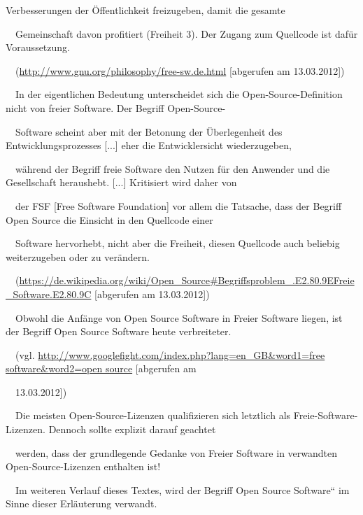 \documentclass[a4paper]{article}
\begin{document}
\begin{itemize}
{{Verbesserungen der \"Offentlichkeit freizugeben, damit die gesamte\par
\ \ Gemeinschaft davon profitiert (Freiheit 3). Der Zugang zum
Quellcode ist daf\"ur Voraussetzung.{\guillemotleft}\par
\ \ (\url{http://www.gnu.org/philosophy/free-sw.de.html} [abgerufen am
13.03.2012])\par \ \ {\guillemotright}In der eigentlichen Bedeutung
unterscheidet sich die Open-Source-Definition nicht von freier
Software. Der Begriff Open-Source-\par \ \ Software scheint aber mit
der Betonung der \"Uberlegenheit des Entwicklungsprozesses [...] eher
die Entwicklersicht wiederzugeben,\par \ \ w\"ahrend der Begriff freie
Software den Nutzen f\"ur den Anwender und die Gesellschaft heraushebt.
[...] Kritisiert wird daher von\par \ \ der FSF [Free Software
Foundation] vor allem die Tatsache, dass der Begriff Open Source die
Einsicht in den Quellcode einer\par \ \ Software hervorhebt, nicht aber
die Freiheit, diesen Quellcode auch beliebig weiterzugeben oder zu
ver\"andern.{\guillemotleft}\par
\ \ (\url{https://de.wikipedia.org/wiki/Open_Source\#Begriffsproblem_.E2.80.9EFreie_Software.E2.80.9C}\foreignlanguage{english}{
}\foreignlanguage{english}{[abgerufen}\foreignlanguage{english}{
}\foreignlanguage{english}{am}\foreignlanguage{english}{
}\foreignlanguage{english}{13.03.2012]})\par \ \ Obwohl die Anf\"ange
von Open Source Software in Freier Software liegen, ist der Begriff
Open Source Software heute verbreiteter.\par \ \ (vgl.
\url{http://www.googlefight.com/index.php?lang=en_GB&word1=free
software&word2=open source} [abgerufen am\par \ \ 13.03.2012])\par
\ \ Die meisten Open-Source-Lizenzen qualifizieren sich letztlich als
Freie-Software-Lizenzen. Dennoch sollte explizit darauf geachtet\par
\ \ werden, dass der grundlegende Gedanke von Freier Software in
verwandten Open-Source-Lizenzen enthalten ist!\par \ \ Im weiteren
Verlauf dieses Textes, wird der Begriff {\quotedblbase}Open Source
Software{\textquotedblleft} im Sinne dieser Erl\"auterung verwandt.}}
\end{itemize}
\end{document}
